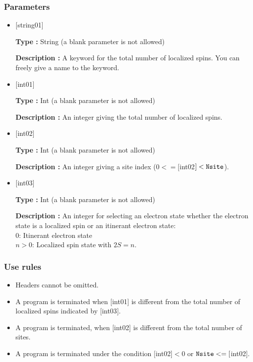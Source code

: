  \subsubsection{Parameters}
 \begin{itemize}

 \item  $[$string01$]$

 {\bf Type :} String (a blank parameter is not allowed)

{\bf Description :} A keyword for the total number of localized spins. You can freely give a name to the keyword.


  \item  $[$int01$]$

 {\bf Type :} Int (a blank parameter is not allowed)

{\bf Description :} An integer giving the total number of localized spins.

 
  \item  $[$int02$]$

 {\bf Type :} Int (a blank parameter is not allowed)

{\bf Description :} An integer giving a site index ($0<= [$int02$] <\verb|Nsite|$).

 
  \item  $[$int03$]$

 {\bf Type :} Int (a blank parameter is not allowed)

{\bf Description :} An integer for selecting an electron state whether the electron state is a localized spin or an itinerant electron state:\\
{
0: Itinerant electron state\\
$n>$0: Localized spin state with $2S=n$.
}\\
 \end{itemize}

\subsubsection{Use rules}
\begin{itemize}
\item Headers cannot be omitted. 
\item A program is terminated when $[$int01$]$ is different from the total number of localized spins indicated by $[$int03$]$.
\item A program is terminated, when $[$int02$]$ is different from the total number of sites.
\item A program is terminated under the condition $[$int02$]<0$ or $\verb|Nsite|<=[$int02$]$.
\end{itemize}


